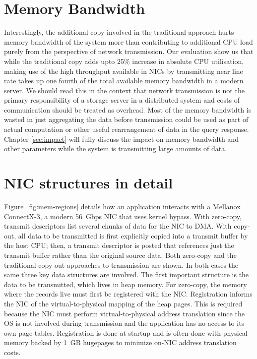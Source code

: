 \section{Memory Bandwidth}
Interestingly, the additional copy involved in the traditional approach hurts memory bandwidth of the system more than contributing 
to additional CPU load purely from the perspective of network transmission. Our evaluation show us that while the traditional
copy adds upto 25\% increase in absolute CPU utilisation, making use of the high throughput available in NICs by transmitting
near line rate takes up one fourth of the total available memory bandwidth in a modern server. We should read this in the context that 
network transmission is not the primary responsibility of a storage server in a distributed system and costs of communication should be treated as overhead.
 Most of the memory bandwidth is wasted in just aggregating the data before transmission could be used as part of actual computation or other useful rearrangement of data in 
the query response. Chapter \ref{sec:impact} will fully discuss the impact on memory bandwidth and other parameters while the system 
is transmitting large amounts of data.


\section{NIC structures in detail}

Figure~\ref{fig:mem-regions} details how an application interacts with a Mellanox
ConnectX-3\textregistered , a modern 56~Gbps NIC that uses kernel bypass. 
With zero-copy, transmit descriptors list several chunks of data for
the NIC to DMA. With copy-out, all data to be transmitted is first explicitly
copied into a transmit buffer by the host CPU; then, a transmit descriptor is
posted that references just the transmit buffer rather than the original
source data. Both zero-copy and the traditional copy-out approaches to transmission are shown.
In both cases the same three key data structures are involved. The first important structure is the
data to be transmitted, which lives in heap memory.  For zero-copy, the memory
where the records live must first be registered with the NIC. Registration
informs the NIC of the virtual-to-physical mapping of the heap pages. This is
required because the NIC must perform virtual-to-physical address translation
since the OS is not involved during transmission and the application has no
access to its own page tables.  Registration is done at startup and is often
done with physical memory backed by 1~GB hugepages to minimize on-NIC address
translation costs.

